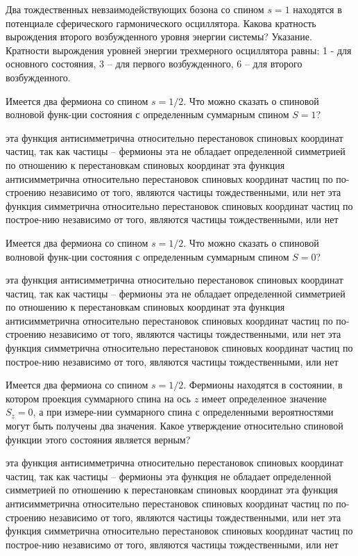 \documentclass[11pt,a4paper]{exam}
\begin{document}
\begin{questions}
\question Два тождественных невзаимодействующих бозона со спином $s = 1$ находятся в потенциале сферического гармонического осциллятора. Какова кратность вырождения второго возбужденного уровня энергии системы? Указание. Кратности вырождения уровней энергии трехмерного осциллятора равны: 1 - для основного состояния, 3 – для первого возбужденного, 6 – для второго возбужденного.
\begin{choices}
\end{choices}

\question Имеется два фермиона со спином $s = 1/2$. Что можно сказать о спиновой волновой функ-ции состояния с определенным суммарным спином $S = 1$?
\begin{choices}
\choice эта функция антисимметрична относительно перестановок спиновых координат частиц, так как частицы – фермионы
\choice эта не обладает определенной симметрией по отношению к перестановкам спиновых координат
\choice эта функция антисимметрична относительно перестановок спиновых координат частиц по по-строению независимо от того, являются частицы тождественными, или нет
\choice эта функция симметрична относительно перестановок спиновых координат частиц по построе-нию независимо от того, являются частицы тождественными, или нет
\end{choices}

\question Имеется два фермиона со спином $s = 1/2$. Что можно сказать о спиновой волновой функ-ции состояния с определенным суммарным спином $S = 0$?
\begin{choices}
\choice эта функция антисимметрична относительно перестановок спиновых координат частиц, так как частицы – фермионы
\choice эта не обладает определенной симметрией по отношению к перестановкам спиновых координат
\choice эта функция антисимметрична относительно перестановок спиновых координат частиц по по-строению независимо от того, являются частицы тождественными, или нет
\choice эта функция симметрична относительно перестановок спиновых координат частиц по построе-нию независимо от того, являются частицы тождественными, или нет
\end{choices}

\question Имеется два фермиона со спином $s = 1/2$. Фермионы находятся в состоянии, в котором проекция суммарного спина на ось $z$ имеет определенное значение ${S_z} = 0$, а при измере-нии суммарного спина с определенными вероятностями могут быть получены два значения. Какое утверждение относительно спиновой функции этого состояния является верным?
\begin{choices}
\choice эта функция антисимметрична относительно перестановок спиновых координат частиц, так как частицы – фермионы
\choice эта функция не обладает определенной симметрией по отношению к перестановкам спиновых координат
\choice эта функция антисимметрична относительно перестановок спиновых координат частиц по по-строению независимо от того, являются частицы тождественными, или нет
\choice эта функция симметрична относительно перестановок спиновых координат частиц по построе-нию независимо от того, являются частицы тождественными, или нет
\end{choices}


\end{questions}
\end{document}
